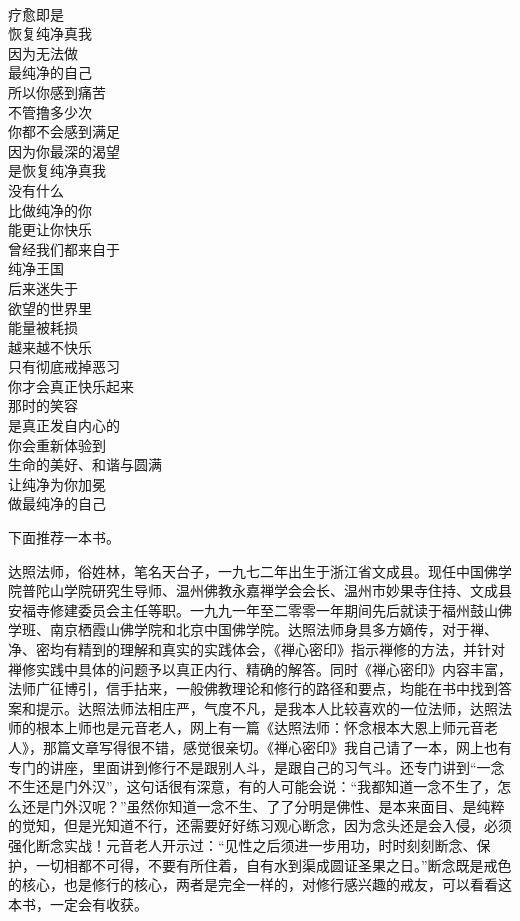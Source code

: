 \begin{poem}[让纯净为你加冕]
    \begin{multicols}{3}
        \begin{center}~\\
            疗愈即是 \\ 恢复纯净真我 \\ 因为无法做 \\ 最纯净的自己 \\ 所以你感到痛苦 \\ 不管撸多少次 \\ 你都不会感到满足 \\ 因为你最深的渴望 \\ 是恢复纯净真我 \\ 没有什么 \\ 比做纯净的你 \\ 能更让你快乐 \\ 曾经我们都来自于 \\ 纯净王国 \\ 后来迷失于 \\ 欲望的世界里 \\ 能量被耗损 \\ 越来越不快乐 \\ 只有彻底戒掉恶习 \\ 你才会真正快乐起来 \\ 那时的笑容 \\ 是真正发自内心的 \\ 你会重新体验到 \\ 生命的美好、和谐与圆满 \\ 让纯净为你加冕 \\ 做最纯净的自己
        \end{center}
    \end{multicols}
\end{poem}

下面推荐一本书。

\begin{book}
    达照法师，俗姓林，笔名天台子，一九七二年出生于浙江省文成县。现任中国佛学院普陀山学院研究生导师、温州佛教永嘉禅学会会长、温州市妙果寺住持、文成县安福寺修建委员会主任等职。一九九一年至二零零一年期间先后就读于福州鼓山佛学班、南京栖霞山佛学院和北京中国佛学院。达照法师身具多方嫡传，对于禅、净、密均有精到的理解和真实的实践体会，《禅心密印》指示禅修的方法，并针对禅修实践中具体的问题予以真正内行、精确的解答。同时《禅心密印》内容丰富，法师广征博引，信手拈来，一般佛教理论和修行的路径和要点，均能在书中找到答案和提示。达照法师法相庄严，气度不凡，是我本人比较喜欢的一位法师，达照法师的根本上师也是元音老人，网上有一篇《达照法师：怀念根本大恩上师元音老人》，那篇文章写得很不错，感觉很亲切。《禅心密印》我自己请了一本，网上也有专门的讲座，里面讲到修行不是跟别人斗，是跟自己的习气斗。还专门讲到“一念不生还是门外汉”，这句话很有深意，有的人可能会说：“我都知道一念不生了，怎么还是门外汉呢？”虽然你知道一念不生、了了分明是佛性、是本来面目、是纯粹的觉知，但是光知道不行，还需要好好练习观心断念，因为念头还是会入侵，必须强化断念实战！元音老人开示过：“见性之后须进一步用功，时时刻刻断念、保护，一切相都不可得，不要有所住着，自有水到渠成圆证圣果之日。”断念既是戒色的核心，也是修行的核心，两者是完全一样的，对修行感兴趣的戒友，可以看看这本书，一定会有收获。
\end{book}
